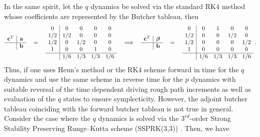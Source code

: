 \documentclass[11pt, oneside]{article}
\numberwithin{equation}{section}
\theoremstyle{definition}
\newcommand{\bs}[1]{\boldsymbol{#1}}
\begin{document}
In the same spirit, let the $q$ dynamics be solved via the standard RK$4$ method whose coefficients are represented by the Butcher tableau, then
\begin{align}
\begin{array}{c|c}
\mathbf{c}^T  & \mathbf{a} \\
\hline
  & \mathbf{b}    
\end{array} 
\quad  =  \quad 
\begin{array}{c|cccc}
0  & 0  & 0  & 0 & 0\\
1/2  & 1/2  & 0  & 0 & 0 \\
1/2  & 0  & 1/2 & 0 & 0  \\
1  & 0  & 0 & 1 & 0 \\
\hline
  & 1/6 &1/3 &1/3   & 1/6    
\end{array}\quad  \Longrightarrow \quad 
\begin{array}{c|c}
\mathbf{c}^T  & \bs{\beta} \\
\hline
  & \mathbf{b}    
\end{array} 
\quad  =  \quad 
\begin{array}{c|cccc}
0  & 0  & 1  & 0 & 0\\
1/2  & 0  & 0  & 1/2 & 0 \\
1/2  & 0  & 0 & 0 & 1/2  \\
1  & 0  & 0 & 0 & 0 \\
\hline
  & 1/6 &1/3 &1/3   & 1/6   
\end{array}\,.\label{eq:RPSPRK rk4}
\end{align}
Thus, if one uses Heun's method or the RK$4$ scheme forward in time for the $q$ dynamics and use the same scheme in reverse time for the $p$ dynamics with suitable reversal of the time dependent driving rough path increments as well as evaluation of the $q$ states to ensure symplecticity. However, the adjoint butcher tableau coinciding with the forward butcher tableau is not true in general. Consider the case where the $q$ dynamics is solved via the $3^{rd}$-order Strong Stability Preserving Runge--Kutta scheme (SSPRK(3,3)) \cite{Shu1988}. Then, we have
\end{document}
